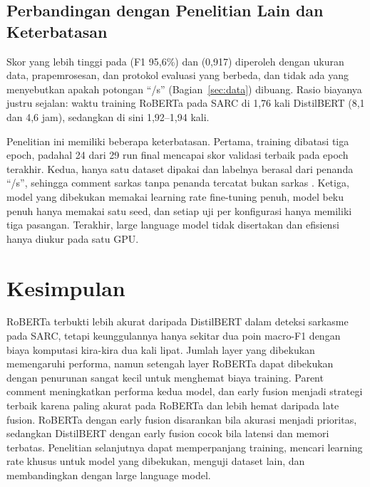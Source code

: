 \documentclass[conference]{IEEEtran}
\begin{document}
\subsection{Perbandingan dengan Penelitian Lain dan Keterbatasan}
Skor yang lebih tinggi pada \cite{dubey2026efficient} (F1 95,6\%) dan \cite{zhang2025enhancing} (0,917) diperoleh dengan ukuran data, prapemrosesan, dan protokol evaluasi yang berbeda, dan tidak ada yang menyebutkan apakah potongan ``/s'' (Bagian~\ref{sec:data}) dibuang. Rasio biayanya justru sejalan: waktu training RoBERTa pada SARC di \cite{dubey2026efficient} 1,76 kali DistilBERT (8,1 dan 4,6 jam), sedangkan di sini 1,92--1,94 kali.

Penelitian ini memiliki beberapa keterbatasan. Pertama, training dibatasi tiga epoch, padahal 24 dari 29 run final mencapai skor validasi terbaik pada epoch terakhir. Kedua, hanya satu dataset dipakai dan labelnya berasal dari penanda ``/s'', sehingga comment sarkas tanpa penanda tercatat bukan sarkas \cite{khodak2018sarc}. Ketiga, model yang dibekukan memakai learning rate fine-tuning penuh, model beku penuh hanya memakai satu seed, dan setiap uji per konfigurasi hanya memiliki tiga pasangan. Terakhir, large language model tidak disertakan dan efisiensi hanya diukur pada satu GPU.

\section{Kesimpulan}
RoBERTa terbukti lebih akurat daripada DistilBERT dalam deteksi sarkasme pada SARC, tetapi keunggulannya hanya sekitar dua poin macro-F1 dengan biaya komputasi kira-kira dua kali lipat. Jumlah layer yang dibekukan memengaruhi performa, namun setengah layer RoBERTa dapat dibekukan dengan penurunan sangat kecil untuk menghemat biaya training. Parent comment meningkatkan performa kedua model, dan early fusion menjadi strategi terbaik karena paling akurat pada RoBERTa dan lebih hemat daripada late fusion. RoBERTa dengan early fusion disarankan bila akurasi menjadi prioritas, sedangkan DistilBERT dengan early fusion cocok bila latensi dan memori terbatas. Penelitian selanjutnya dapat memperpanjang training, mencari learning rate khusus untuk model yang dibekukan, menguji dataset lain, dan membandingkan dengan large language model.



\end{document}
